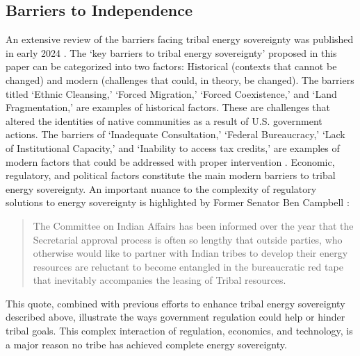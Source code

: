 \documentclass{anstrans}
\begin{document}
\subsection{Barriers to Independence}
An extensive review of the barriers facing tribal energy sovereignty was
published in early 2024 \cite{raimi_securing_2024}. The `key barriers to tribal
energy sovereignty' proposed in this paper can be categorized into two factors:
Historical (contexts that cannot be changed) and modern (challenges that could,
in theory, be changed). The barriers titled `Ethnic Cleansing,' `Forced
Migration,' `Forced Coexistence,' and `Land Fragmentation,' are examples of
historical factors. These are challenges that altered the identities of native
communities as a result of U.S. government actions. The barriers of `Inadequate
Consultation,' `Federal Bureaucracy,' `Lack of Institutional Capacity,' and
`Inability to access tax credits,' are examples of modern factors that could be
addressed with proper intervention \cite{raimi_securing_2024}. Economic,
regulatory, and political factors constitute the main modern barriers to tribal
energy sovereignty. An important nuance to the complexity of regulatory
solutions to energy sovereignty is highlighted by Former Senator Ben Campbell
\cite{kronk2012} : 
\begin{quote}
  The Committee on Indian Affairs has been informed over the year that the
  Secretarial approval process is often so lengthy that outside parties, who
  otherwise would like to partner with Indian tribes to develop their energy
  resources are reluctant to become entangled in the bureaucratic red tape that
  inevitably accompanies the leasing of Tribal resources.
\end{quote}
This quote, combined with previous efforts to enhance tribal energy sovereignty
described above, illustrate the ways government regulation could help or hinder
tribal goals. This complex interaction of regulation, economics, and technology,
is a major reason no tribe has achieved complete energy sovereignty.

\end{document}
